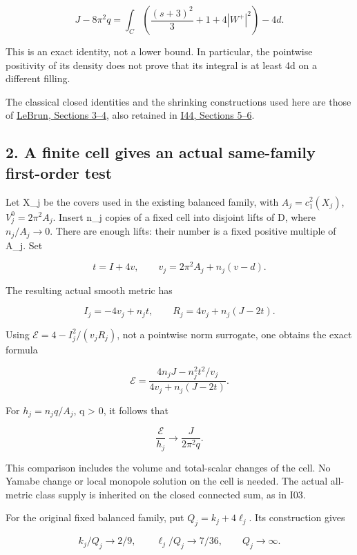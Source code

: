 \documentclass[
  10pt,
]{article}
\begin{document}
\[
 \boxed{J-8\pi^2q
 =\int_C\left(\frac{(s+3)^2}{3}+1+4|W^+|^2\right)-4d.}     \tag{1.2}
\]

This is an exact identity, not a lower bound. In particular, the
pointwise positivity of its density does not prove that its integral is
at least 4d on a different filling.

The classical closed identities and the shrinking constructions used
here are those of \href{https://arxiv.org/html/math/0003068}{LeBrun,
Sections 3--4}, also retained in
\href{20260927_covering_geometry_and_sharp_subfamilies.md}{I44, Sections
5--6}.

\hypertarget{a-finite-cell-gives-an-actual-same-family-first-order-test}{%
\subsection{2. A finite cell gives an actual same-family first-order
test}\label{a-finite-cell-gives-an-actual-same-family-first-order-test}}

Let X\_j be the covers used in the existing balanced family, with
\(A_j=c_1^2(X_j)\), \(V_j^0=2\pi^2A_j\). Insert n\_j copies of a fixed
cell into disjoint lifts of D, where \(n_j/A_j\to0\). There are enough
lifts: their number is a fixed positive multiple of A\_j. Set

\[
 t=I+4v,\qquad v_j=2\pi^2A_j+n_j(v-d).
\]

The resulting actual smooth metric has

\[
 I_j=-4v_j+n_jt,\qquad
 R_j=4v_j+n_j(J-2t).
\]

Using \(\mathcal E=4-I_j^2/(v_jR_j)\), not a pointwise norm surrogate,
one obtains the exact formula

\[
 \boxed{\mathcal E
   =\frac{4n_jJ-n_j^2t^2/v_j}{4v_j+n_j(J-2t)}.}            \tag{2.1}
\]

For \(h_j=n_jq/A_j\), q \textgreater{} 0, it follows that

\[
             \frac{\mathcal E}{h_j}\longrightarrow
                         \frac{J}{2\pi^2q}.              \tag{2.2}
\]

This comparison includes the volume and total-scalar changes of the
cell. No Yamabe change or local monopole solution on the cell is needed.
The actual all-metric class supply is inherited on the closed connected
sum, as in I03.

For the original fixed balanced family, put \(Q_j=k_j+4\ell_j\). Its
construction gives

\[
 k_j/Q_j\to2/9,\qquad \ell_j/Q_j\to7/36,\qquad Q_j\to\infty.
\]
\end{document}
